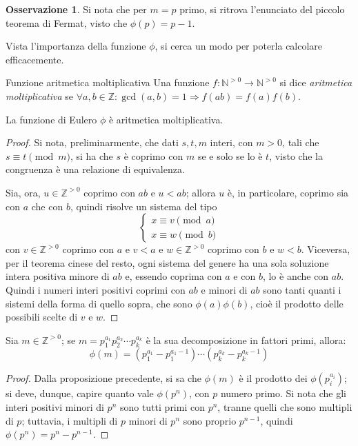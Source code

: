 \documentclass[11pt, a4paper]{scrartcl}
\theoremstyle{definition}
\numberwithin{esempio}{section}
\theoremstyle{definition}
\newtheorem{obs}{Osservazione}
\numberwithin{obs}{section}
\numberwithin{nota}{section}
\numberwithin{equation}{subsection}
\begin{document}
\begin{obs}
	Si nota che per $m=p$ primo, si ritrova l'enunciato del piccolo teorema di Fermat, visto che $\phi (p) = p-1$.
\end{obs}
\noindent Vista l'importanza della funzione $\phi $, si cerca un modo per poterla calcolare efficacemente. 
\begin{definizione}
	{Funzione aritmetica moltiplicativa}{}
	Una funzione $f: \mathbb{N}^{>0} \to \mathbb{N}^{>0}  $ si dice \textit{aritmetica moltiplicativa} se $\forall a,b \in \mathbb{Z} : \operatorname{gcd}(a,b) =1 \Rightarrow f(ab) = f(a)f(b)$.
\end{definizione}
\begin{prop}
	{}{}
	La funzione di Eulero $\phi $ \`e aritmetica moltiplicativa.
	\begin{proof}
		Si nota, preliminarmente, che dati $s,t,m $ interi, con $m>0$, tali che $s\equiv t \pmod{m} $, si ha che $s$ \`e coprimo con $m$ se e solo se lo \`e $t$, visto che la congruenza \`e una relazione di equivalenza.

		Sia, ora, $u \in \mathbb{Z}^{>0} $ coprimo con $ab$ e $u<ab$; allora $u$ \`e, in particolare, coprimo sia con $a$ che con $b$, quindi risolve un sistema del tipo 
		\[
		\begin{cases}
			x\equiv v \pmod{a} \\
			x\equiv w \pmod{b} 
		\end{cases}
		\] 
		con $v \in \mathbb{Z}^{>0} $ coprimo con $a$ e $v<a$ e $w \in \mathbb{Z}^{>0} $ coprimo con $b$ e $w<b$.
		Viceversa, per il teorema cinese del resto, ogni sistema del genere ha una sola soluzione intera positiva minore di $ab$ e, essendo coprima con $a$ e con $b$, lo \`e anche con $ab$.
		Quindi i numeri interi positivi coprimi con $ab$ e minori di $ab$ sono tanti quanti i sistemi della forma di quello sopra, che sono $\phi (a) \phi (b)$, cio\`e il prodotto delle possibili scelte di $v$ e $w$.
	\end{proof}
\end{prop}
\begin{teorema}
	{}{}
	Sia $m \in \mathbb{Z}^{>0} $; se $m = p_1^{a_1} p_2^{a_2} \cdots p_k^{a_k} $ \`e la sua decomposizione in fattori primi, allora:
	\[
	\phi (m) = \left(p_1^{a_1} - p_1^{a_1-1} \right)  \cdots \left(p_k^{a_k} - p_k^{a_k-1} \right) 
	\] 
	\begin{proof}
		Dalla proposizione precedente, si sa che $\phi (m)$ \`e il prodotto dei $\phi (p_i^{a_i} )$; si deve, dunque, capire quanto vale $\phi (p^n)$, con $p$ numero primo.
		Si nota che gli interi positivi minori di $p^n$ sono tutti primi con $p^n$, tranne quelli che sono multipli di $p$; tuttavia, i multipli di $p$ minori di $p^n$ sono proprio $p^{n-1} $, quindi $\phi (p^n) = p^n - p^{n-1} $.
	\end{proof}
\end{teorema}
\end{document}
